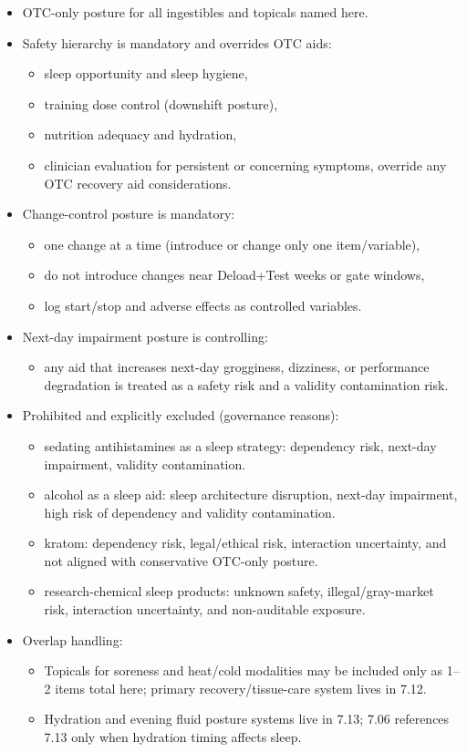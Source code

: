 \documentclass[10pt]{article}
\begin{document}
\begin{itemize}
\item OTC-only posture for all ingestibles and topicals named here.
\item Safety hierarchy is mandatory and overrides OTC aids:
  \begin{itemize}
  \item sleep opportunity and sleep hygiene,
  \item training dose control (downshift posture),
  \item nutrition adequacy and hydration,
  \item clinician evaluation for persistent or concerning symptoms,
    override any OTC recovery aid considerations.
  \end{itemize}
\item Change-control posture is mandatory:
  \begin{itemize}
  \item one change at a time (introduce or change only one item/variable),
  \item do not introduce changes near Deload+Test weeks or gate windows,
  \item log start/stop and adverse effects as controlled variables.
  \end{itemize}
\item Next-day impairment posture is controlling:
  \begin{itemize}
  \item any aid that increases next-day grogginess, dizziness, or performance degradation is treated as a safety risk and a validity contamination risk.
  \end{itemize}
\item Prohibited and explicitly excluded (governance reasons):
  \begin{itemize}
  \item sedating antihistamines as a sleep strategy: dependency risk, next-day impairment, validity contamination.
  \item alcohol as a sleep aid: sleep architecture disruption, next-day impairment, high risk of dependency and validity contamination.
  \item kratom: dependency risk, legal/ethical risk, interaction uncertainty, and not aligned with conservative OTC-only posture.
  \item research-chemical sleep products: unknown safety, illegal/gray-market risk, interaction uncertainty, and non-auditable exposure.
  \end{itemize}
\item Overlap handling:
  \begin{itemize}
  \item Topicals for soreness and heat/cold modalities may be included only as 1–2 items total here; primary recovery/tissue-care system lives in 7.12.
  \item Hydration and evening fluid posture systems live in 7.13; 7.06 references 7.13 only when hydration timing affects sleep.
  \end{itemize}
\end{itemize}
\end{document}
